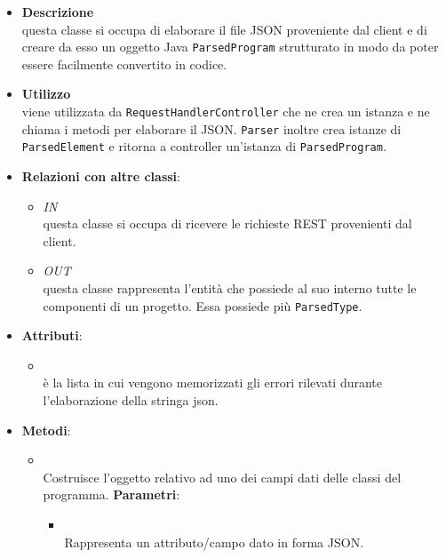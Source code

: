 \begin{itemize}
\item \textbf{Descrizione}\\
questa classe si occupa di elaborare il file JSON proveniente dal client e di creare da esso un oggetto Java \texttt{ParsedProgram} strutturato in modo da poter essere facilmente convertito in codice.
\item \textbf{Utilizzo}\\
viene utilizzata da \texttt{RequestHandlerController} che ne crea un istanza e ne chiama i metodi per elaborare il JSON. \texttt{Parser} inoltre crea istanze di \texttt{ParsedElement} e ritorna a controller un'istanza di \texttt{ParsedProgram}.
\item \textbf{Relazioni con altre classi}:
\begin{itemize}
\item \textit{IN} \hyperref[\nogloxy{swedesigner::server::controller::RequestHandlerController}]{}\\
questa classe si occupa di ricevere le richieste REST provenienti dal client.
\item \textit{OUT} \hyperref[\nogloxy{swedesigner::server::project::ParsedProgram}]{}\\
questa classe rappresenta l'entità che possiede al suo interno tutte le componenti di un progetto. Essa possiede più \texttt{ParsedType}.
\end{itemize}
\item \textbf{Attributi}:
\begin{itemize}
\item {}
\\ è la lista in cui vengono memorizzati gli errori rilevati durante l'elaborazione della stringa json.
\end{itemize}
\item \textbf{Metodi}:
\begin{itemize}
\item {}
\\ Costruisce l'oggetto relativo ad uno dei campi dati delle classi del programma.
\textbf{Parametri}:
\begin{itemize}
\item {}
\\ Rappresenta un attributo/campo dato in forma JSON.
\end{itemize}

\end{itemize}
\end{itemize}

